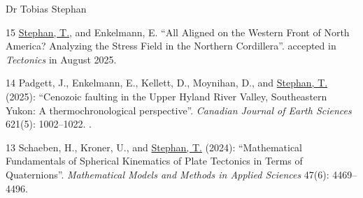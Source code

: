 \documentclass[10pt, paper=letter]{scrartcl} %
\begin{document}
\begin{cv}{\textsf{Dr Tobias Stephan}}
\begin{cvlist}{}
        \item[15] \ul{Stephan, T.}, and Enkelmann, E. \enquote{All Aligned on the Western Front of North America? Analyzing the Stress Field in the Northern Cordillera}. accepted in \textit{Tectonics} in August 2025.

        \item[14] Padgett, J., Enkelmann, E., Kellett, D., Moynihan, D., and \ul{Stephan, T.} (2025): \enquote{Cenozoic faulting in the Upper Hyland River Valley, Southeastern Yukon: A thermochronological perspective}. \textit{Canadian Journal of Earth Sciences} 621(5): 1002--1022. .
        
        \item[13] Schaeben, H., Kroner, U., and \ul{Stephan, T.} (2024): \enquote{Mathematical Fundamentals of Spherical Kinematics of Plate Tectonics in Terms of Quaternions}. \textit{Mathematical Models and Methods in Applied Sciences} 47(6): 4469--4496. 


\end{cvlist}
\end{cv}
\end{document}
